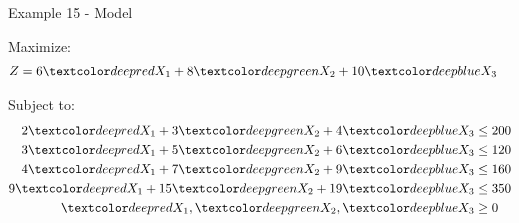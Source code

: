 \begin{frame}{Example 15 - Model}

Maximize:
\begin{align*}
    Z &= 6\colora{X_1} + 8\colorb{X_2} + 10\colorc{X_3}
\end{align*}

Subject to:
\begin{align*}
    2\colora{X_1} +  3\colorb{X_2} +  4\colorc{X_3} &\le 200 \\
    3\colora{X_1} +  5\colorb{X_2} +  6\colorc{X_3} &\le 120 \\
    4\colora{X_1} +  7\colorb{X_2} +  9\colorc{X_3} &\le 160 \\
    9\colora{X_1} + 15\colorb{X_2} + 19\colorc{X_3} &\le 350 \\
    \colora{X_1}, \colorb{X_2}, \colorc{X_3} &\ge 0
\end{align*}

\end{frame}
